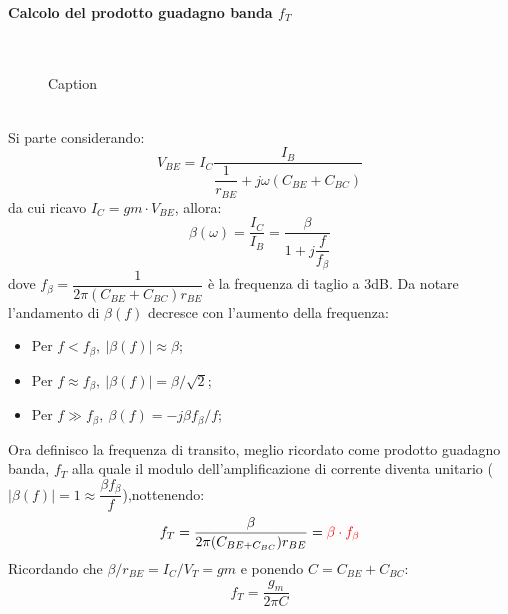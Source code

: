 \paragraph{Calcolo del prodotto guadagno banda $f_T$}\mbox{}\\
\begin{figure}[hbt!]
    \centering
    \caption{Caption}
    \label{fig:enter-label}
\end{figure}\\
%
Si parte considerando:
%
\begin{equation}
    V_{BE}=I_C \dfrac{I_B}{\dfrac{1}{r_{BE}}+j\omega (C_{BE}+C_{BC})}
\end{equation}
%
da cui ricavo $I_C=gm \cdot V_{BE}$, allora:
%
\begin{equation}
    \beta(\omega)=\dfrac{I_C}{I_B}=\dfrac{\beta}{1+j\dfrac{f}{f_{\beta}}}
\end{equation}
%
dove $f_{\beta}=\dfrac{1}{2\pi(C_{BE}+C_{BC})r_{BE}}$ è la frequenza di taglio a 3dB.
Da notare l'andamento di $\beta(f)$ decresce con l'aumento della frequenza:
\begin{itemize}
    \item Per $f<f_{\beta},\ |\beta(f)| \approx \beta$;
    \item Per $f \approx f_{\beta},\ |\beta(f)|=\beta/\sqrt{2}$;
    \item Per $f \gg f_{\beta},\ \beta(f)=-j\beta f_{\beta}/f$;
\end{itemize}
%
Ora definisco la frequenza di transito, meglio ricordato come prodotto guadagno banda, $f_T$ alla quale il modulo dell'amplificazione di corrente diventa unitario ($|\beta(f)|= 1 \approx \dfrac{\beta f_{\beta}}{f}$),nottenendo:
%
\begin{equation}
    f_T=\dfrac{\beta}{2\pi (C_{BE+C_{BC}})r_{BE}}=\textcolor{red}{\beta \cdot f_{\beta}}
\end{equation}
%
Ricordando che $\beta/r_{BE}=I_C/V_T=gm$ e ponendo $C=C_{BE}+C_{BC}$:
\begin{equation}
    f_T=\dfrac{g_m}{2\pi C}
\end{equation}
%
\cleardoublepage

